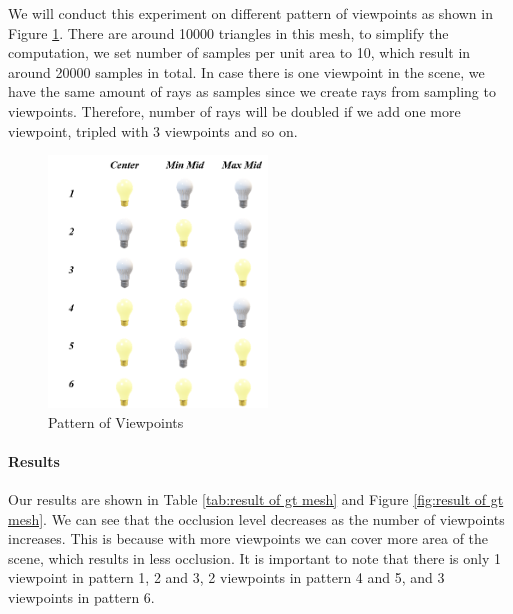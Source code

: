 \documentclass[11pt, a4paper,oneside,chapterprefix=false]{scrbook}
\begin{document}
\vspace{10pt}

We will conduct this experiment on different pattern of viewpoints as shown in Figure \ref{fig:pattern of viewpoints}. 
There are around 10000 triangles in this mesh, to simplify the computation, we set number of samples per unit area to 10, which result in around 20000 samples in total. In case there is one viewpoint in the scene, we have the same amount of rays as samples since we create rays from sampling to viewpoints. Therefore, number of rays will be doubled if we add one more viewpoint, tripled with 3 viewpoints and so on.

\begin{figure}[H]
    \centering
    \includegraphics*[width=0.52\textwidth]{figures/pattern of light sources.png}
    \caption{Pattern of Viewpoints}
    \label{fig:pattern of viewpoints}
\end{figure}

\vspace{10pt}

\paragraph{Results}

Our results are shown in Table \ref{tab:result of gt mesh} and Figure \ref{fig:result of gt mesh}. We can see that the occlusion level decreases as the number of viewpoints increases. This is because with more viewpoints we can cover more area of the scene, which results in less occlusion. It is important to note that there is only 1 viewpoint in pattern 1, 2 and 3, 2 viewpoints in pattern 4 and 5, and 3 viewpoints in pattern 6. 

\vspace{10pt}
\end{document}
